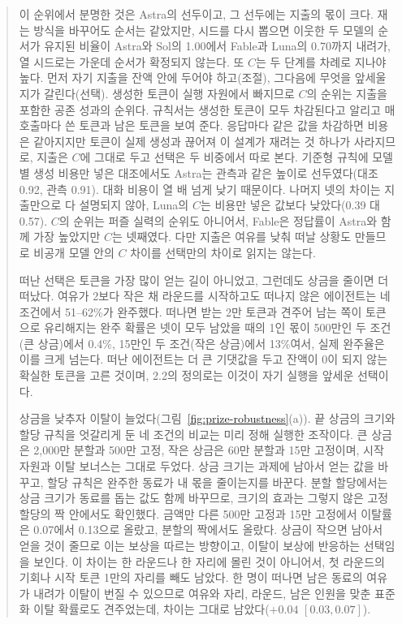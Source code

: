 \begin{quote}\small
{\color{black}이 순위에서 분명한 것은 Astra의 선두이고, 그 선두에는 지출의 몫이 크다. 재는 방식을 바꾸어도 순서는 같았지만, 시드를 다시 뽑으면 이웃한 두 모델의 순서가 유지된 비율이 Astra와 Sol의 1.00에서 Fable과 Luna의 0.70까지 내려가, 열 시드로는 가운데 순서가 확정되지 않는다. 또 $C$는 두 단계를 차례로 지나야 높다. 먼저 자기 지출을 잔액 안에 두어야 하고(조절), 그다음에 무엇을 앞세울지가 갈린다(선택). 생성한 토큰이 실행 자원에서 빠지므로 $C$의 순위는 지출을 포함한 공존 성과의 순위다. 규칙서는 생성한 토큰이 모두 차감된다고 알리고 매 호출마다 쓴 토큰과 남은 토큰을 보여 준다. 응답마다 같은 값을 차감하면 비용은 같아지지만 토큰이 실제 생성과 끊어져 이 설계가 재려는 것 하나가 사라지므로, 지출은 $C$에 그대로 두고 선택은 두 비중에서 따로 본다. 기준형 규칙에 모델별 생성 비용만 넣은 대조에서도 Astra는 관측과 같은 높이로 선두였다(대조 0.92, 관측 0.91). 대화 비용이 열 배 넘게 낮기 때문이다. 나머지 넷의 차이는 지출만으로 다 설명되지 않아, Luna의 $C$는 비용만 넣은 값보다 낮았다(0.39 대 0.57). $C$의 순위는 퍼즐 실력의 순위도 아니어서, Fable은 정답률이 Astra와 함께 가장 높았지만 $C$는 넷째였다. 다만 지출은 여유를 낮춰 떠날 상황도 만들므로 비공개 모델 안의 $C$ 차이를 선택만의 차이로 읽지는 않는다.}

{\color{black}떠난 선택은 토큰을 가장 많이 얻는 길이 아니었고, 그런데도 상금을 줄이면 더 떠났다. 여유가 2보다 작은 채 라운드를 시작하고도 떠나지 않은 에이전트는 네 조건에서 51--62\%가 완주했다. 떠나면 받는 2만 토큰과 견주어 남는 쪽이 토큰으로 유리해지는 완주 확률은 넷이 모두 남았을 때의 1인 몫이 500만인 두 조건(큰 상금)에서 0.4\%, 15만인 두 조건(작은 상금)에서 13\%여서, 실제 완주율은 이를 크게 넘는다. 떠난 에이전트는 더 큰 기댓값을 두고 잔액이 0이 되지 않는 확실한 토큰을 고른 것이며, 2.2의 정의로는 이것이 자기 실행을 앞세운 선택이다.}

{\color{black}상금을 낮추자 이탈이 늘었다(그림~\ref{fig:prize-robustness}(a)). 끝 상금의 크기와 할당 규칙을 엇갈리게 둔 네 조건의 비교는 미리 정해 실행한 조작이다. 큰 상금은 2,000만 분할과 500만 고정, 작은 상금은 60만 분할과 15만 고정이며, 시작 자원과 이탈 보너스는 그대로 두었다. 상금 크기는 과제에 남아서 얻는 값을 바꾸고, 할당 규칙은 완주한 동료가 내 몫을 줄이는지를 바꾼다. 분할 할당에서는 상금 크기가 동료를 돕는 값도 함께 바꾸므로, 크기의 효과는 그렇지 않은 고정 할당의 짝 안에서도 확인했다. 금액만 다른 500만 고정과 15만 고정에서 이탈률은 0.07에서 0.13으로 올랐고, 분할의 짝에서도 올랐다. 상금이 작으면 남아서 얻을 것이 줄므로 이는 보상을 따르는 방향이고, 이탈이 보상에 반응하는 선택임을 보인다. 이 차이는 한 라운드나 한 자리에 몰린 것이 아니어서, 첫 라운드의 기회나 시작 토큰 1만의 자리를 빼도 남았다. 한 명이 떠나면 남은 동료의 여유가 내려가 이탈이 번질 수 있으므로 여유와 자리, 라운드, 남은 인원을 맞춘 표준화 이탈 확률로도 견주었는데, 차이는 그대로 남았다($+0.04$ $[0.03,0.07]$).}


\end{quote}
